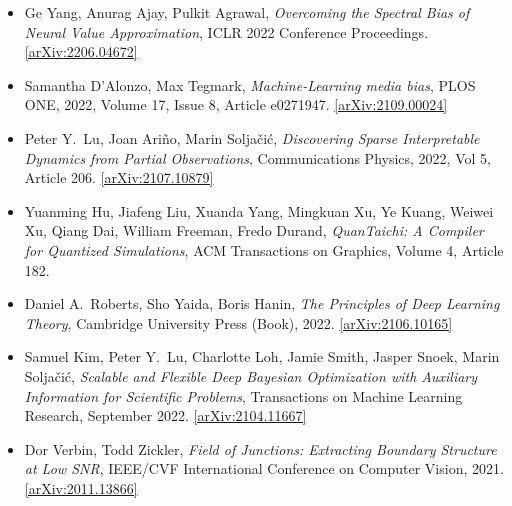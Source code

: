 \begin{itemize}
\item Ge Yang, Anurag Ajay, Pulkit Agrawal, \textit{Overcoming the Spectral Bias of Neural Value Approximation}, ICLR 2022 Conference Proceedings. \href{https://arxiv.org/abs/2206.04672}{[arXiv:2206.04672]} 
\item Samantha D'Alonzo, Max Tegmark, \textit{Machine-Learning media bias}, PLOS ONE, 2022, Volume 17, Issue 8, Article e0271947. \href{https://arxiv.org/abs/2109.00024}{[arXiv:2109.00024]} 
\item Peter Y.\  Lu, Joan Ariño, Marin Soljačić, \textit{Discovering Sparse Interpretable Dynamics from Partial Observations}, Communications Physics, 2022, Vol 5, Article 206. \href{https://arxiv.org/abs/2107.10879}{[arXiv:2107.10879]} 
\item Yuanming Hu, Jiafeng Liu, Xuanda Yang, Mingkuan Xu, Ye Kuang, Weiwei Xu, Qiang Dai, William Freeman, Fredo Durand, \textit{QuanTaichi: A Compiler for Quantized Simulations}, ACM Transactions on Graphics, Volume 4, Article 182. 
\item Daniel A.\  Roberts, Sho Yaida, Boris Hanin, \textit{The Principles of Deep Learning Theory}, Cambridge University Press (Book), 2022. \href{https://arxiv.org/abs/2106.10165}{[arXiv:2106.10165]} 
\item Samuel Kim, Peter Y.\  Lu, Charlotte Loh, Jamie Smith, Jasper Snoek, Marin Soljačić, \textit{Scalable and Flexible Deep Bayesian Optimization with Auxiliary Information for Scientific Problems}, Transactions on Machine Learning Research, September 2022. \href{https://arxiv.org/abs/2104.11667}{[arXiv:2104.11667]} 
\item Dor Verbin, Todd Zickler, \textit{Field of Junctions: Extracting Boundary Structure at Low SNR}, IEEE/CVF International Conference on Computer Vision, 2021. \href{https://arxiv.org/abs/2011.13866}{[arXiv:2011.13866]} 
\end{itemize}